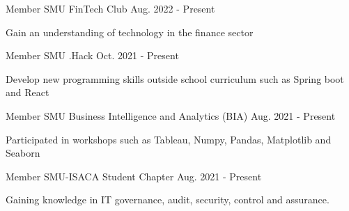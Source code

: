 

\begin{cventries}

    \cventry
    {Member} %
    {SMU FinTech Club} %
    {Aug. 2022 - Present} %
    {} 
    {
      \begin{cvitems} %
        \item {Gain an understanding of technology in the finance sector}
      \end{cvitems}
    }

    \cventry
    {Member} %
    {SMU .Hack} %
    {Oct. 2021 - Present} %
    {} 
    {
      \begin{cvitems} %
        \item {Develop new programming skills outside school curriculum such as Spring boot and React}
      \end{cvitems}
    }
    
    \cventry
    {Member} %
    {SMU Business Intelligence and Analytics (BIA)} %
    {Aug. 2021 - Present} %
    {} 
    {
      \begin{cvitems} %
        \item {Participated in workshops such as Tableau, Numpy, Pandas, Matplotlib and Seaborn}
      \end{cvitems}
    }

    \cventry
    {Member} %
    {SMU-ISACA Student Chapter} %
    {Aug. 2021 - Present} %
    {} 
    {
      \begin{cvitems} %
        \item {Gaining knowledge in IT governance, audit, security, control and assurance.}
      \end{cvitems}
    }


\end{cventries}

